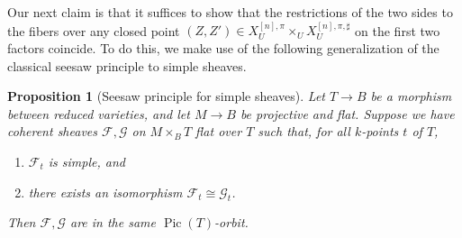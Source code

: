 \documentclass{amsart}
\theoremstyle{plain}
\newtheorem{proposition}[theorem]{Proposition}
\theoremstyle{definition}
\theoremstyle{remark}
\begin{document}
    Our next claim is that it suffices to show that the restrictions of the two sides to the fibers over any closed point $(Z,Z')\in X^{[n],\pi}_U\times_UX^{[n],\pi,\sharp}_U$ on the first two factors coincide.
    To do this, we make use of the following generalization of the classical seesaw principle to simple sheaves.
    \begin{proposition}[Seesaw principle for simple sheaves]\label{seesaw}
        Let $T\to B$ be a morphism between reduced varieties, and let $M\to B$ be projective and flat.
        Suppose we have coherent sheaves $\mathcal F,\mathcal G$ on $M\times_BT$ flat over $T$ such that, for all $k$-points $t$ of $T$,
        \begin{enumerate}
            \item $\mathcal F_t$ is simple, and
            \item there exists an isomorphism $\mathcal F_t\cong\mathcal G_t$.
        \end{enumerate}
        Then $\mathcal F,\mathcal G$ are in the same $\operatorname{Pic}(T)$-orbit.
    \end{proposition}
\end{document}
